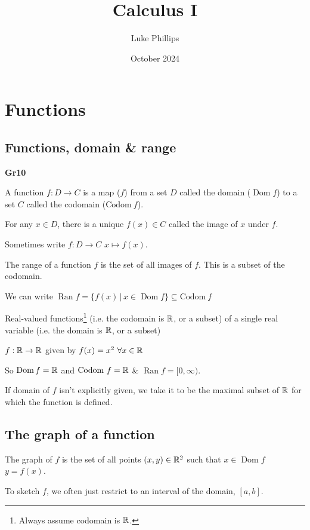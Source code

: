 \documentclass[10pt, a4paper]{article}
\title{Calculus I}
\author{Luke Phillips}
\date{October 2024}
\DeclareMathOperator{\Dom}{Dom}
\DeclareMathOperator{\Ran}{Ran}
\begin{document}
\maketitle

\newpage

\tableofcontents

\newpage

\section{Functions}

\subsection{Functions, domain \& range}

\textbf{Gr10}

\begin{definition}
    A function $f : D \rightarrow C$ is a map ($f$) from a set $D$ called the domain ($\Dom f$) to a set $C$ called the codomain ($\mathrm{Codom}\ f$).
    
    For any $x \in D$, there is a unique $f(x) \in C$ called the image of $x$ under $f$.
\end{definition}

Sometimes  write $f : D \rightarrow C$ $x \mapsto f(x)$.

\begin{definition}
    The range of a function $f$ is the set of all images of $f$. This is a subset of the codomain.
    
    We can write $\Ran f = \{f(x)\,|\,x \in \Dom f\} \subseteq \mathrm{Codom}\ f$
\end{definition}

Real-valued functions\footnote{Always assume codomain is $\mathbb{R}$.} (i.e. the codomain is $\mathbb{R}$, or a subset) of a single real variable (i.e. the domain is $\mathbb{R}$, or a subset)

\begin{example}
    $f : \mathbb{R} \rightarrow \mathbb{R}$ given by $f(x) = x ^ 2\ \forall x \in \mathbb{R}$

    So $\Dom f = \R$ and $\mathrm{Codom}\ f = \mathbb{R}$ \& $\Ran f = [0, \infty)$.
\end{example}

If domain of $f$ isn't explicitly given, we take it to be the maximal subset of $\mathbb{R}$ for which the function is defined.

\subsection{The graph of a function}
\begin{definition}[Graph]
    The graph of $f$ is the set of all points $(x, y) \in \mathbb{R} ^ 2$ such that $x \in \Dom f$ $y = f(x)$.
\end{definition}
To sketch $f$, we often just restrict to an interval of the domain, $[a, b]$.
\end{document}
